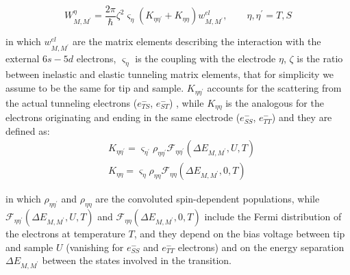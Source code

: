\documentclass[
reprint,amsmath,amssymb,aps]{revtex4-2}
\begin{document}

\begin{equation}
    W_{M,M^{\prime}}^{\eta}=\dfrac{2\pi}{\hbar} \zeta^2 \varsigma_{\eta} \left( K_{\eta \eta^{\prime}}+ K_{\eta \eta} \right)w_{M,M^{\prime}}^{el}, \qquad \eta,\eta^{\prime}=T,S
    \label{eq:elec_rates}
\end{equation}

in which $w_{M,M^{\prime}}^{el}$ are the matrix elements describing the interaction with the external $6s-5d$ electrons, $\varsigma_{\eta}$ is the coupling with the electrode $\eta$, $\zeta$ is the ratio between inelastic and elastic tunneling matrix elements, that for simplicity we assume to be the same for tip and sample. $K_{\eta \eta^{\prime}}$ accounts for the scattering from the actual tunneling electrons ($e^{-}_{TS}$, $e^{-}_{ST}$) , while $K_{\eta \eta}$ is the analogous for the electrons originating and ending in the same electrode ($e^{-}_{SS}$, $e^{-}_{TT}$) and they are defined as:
\begin{align}
    &K_{\eta \eta^{\prime}}=\varsigma_{\eta^{\prime}} \rho_{\eta \eta^{\prime}}\mathcal{F}_{\eta \eta^{\prime}}(\Delta E_{M,M^{\prime}},U,T) \\
    &K_{\eta \eta}=\varsigma_{\eta} \rho_{\eta \eta}\mathcal{F}_{\eta \eta}(\Delta E_{M,M^{\prime}},0,T) 
\end{align}

in which $\rho_{\eta \eta^{\prime}}$ and $\rho_{\eta \eta}$ are the convoluted spin-dependent populations, while $\mathcal{F}_{\eta \eta^{\prime}}(\Delta E_{M,M^{\prime}},U,T)$ and $\mathcal{F}_{\eta \eta}(\Delta E_{M,M^{\prime}},0,T)$ include the Fermi distribution of the electrons at temperature $T$, and they depend on the bias voltage between tip and sample $U$ (vanishing for $e^{-}_{SS}$ and $e^{-}_{TT}$ electrons) and on the energy separation $\Delta E_{M,M^{\prime}}$ between the states involved in the transition.
\end{document}
